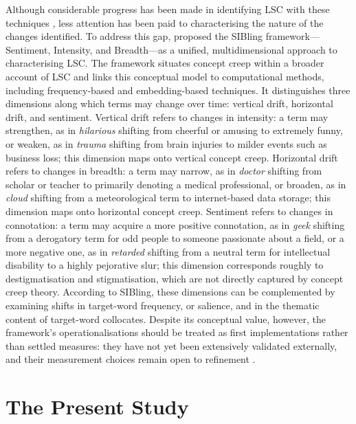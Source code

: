 Although considerable progress has been made in identifying LSC with these techniques \citep[see][]{tahmasebiSurveyComputationalApproaches2019,kutuzovDiachronicWordEmbeddings2018,tangStateoftheartSemanticChange2018}, less attention has been paid to characterising the nature of the changes identified. To address this gap, \citet{baesMultidimensionalFrameworkEvaluating2024} proposed the SIBling framework---Sentiment, Intensity, and Breadth---as a unified, multidimensional approach to characterising LSC. The framework situates concept creep within a broader account of LSC and links this conceptual model to computational methods, including frequency-based and embedding-based techniques. It distinguishes three dimensions along which terms may change over time: vertical drift, horizontal drift, and sentiment. Vertical drift refers to changes in intensity: a term may strengthen, as in \textit{hilarious} shifting from cheerful or amusing to extremely funny, or weaken, as in \textit{trauma} shifting from brain injuries to milder events such as business loss; this dimension maps onto vertical concept creep. Horizontal drift refers to changes in breadth: a term may narrow, as in \textit{doctor} shifting from scholar or teacher to primarily denoting a medical professional, or broaden, as in \textit{cloud} shifting from a meteorological term to internet-based data storage; this dimension maps onto horizontal concept creep. Sentiment refers to changes in connotation: a term may acquire a more positive connotation, as in \textit{geek} shifting from a derogatory term for odd people to someone passionate about a field, or a more negative one, as in \textit{retarded} shifting from a neutral term for intellectual disability to a highly pejorative slur; this dimension corresponds roughly to destigmatisation and stigmatisation, which are not directly captured by concept creep theory. According to SIBling, these dimensions can be complemented by examining shifts in target-word frequency, or salience, and in the thematic content of target-word collocates. Despite its conceptual value, however, the framework's operationalisations should be treated as first implementations rather than settled measures: they have not yet been extensively validated externally, and their measurement choices remain open to refinement \citep{baesMultidimensionalFrameworkEvaluating2024}.

\section{The Present Study}

